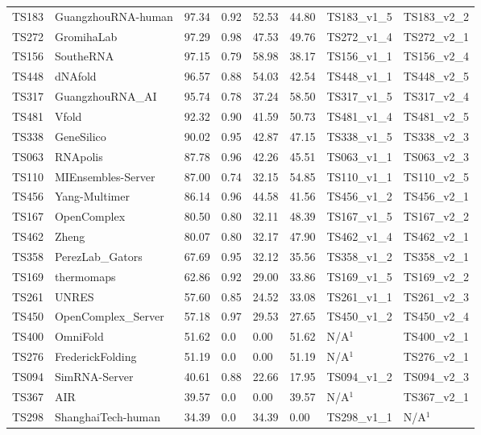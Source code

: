 \begin{table}[ht]
{\begin{tabular}{llllllll}
TS183 & GuangzhouRNA-human & 97.34 & 0.92 & 52.53 & 44.80 & TS183\_v1\_5 & TS183\_v2\_2 \\ 
TS272 & GromihaLab & 97.29 & 0.98 & 47.53 & 49.76 & TS272\_v1\_4 & TS272\_v2\_1 \\ 
TS156 & SoutheRNA & 97.15 & 0.79 & 58.98 & 38.17 & TS156\_v1\_1 & TS156\_v2\_4 \\ 
TS448 & dNAfold & 96.57 & 0.88 & 54.03 & 42.54 & TS448\_v1\_1 & TS448\_v2\_5 \\ 
TS317 & GuangzhouRNA\_AI & 95.74 & 0.78 & 37.24 & 58.50 & TS317\_v1\_5 & TS317\_v2\_4 \\ 
TS481 & Vfold & 92.32 & 0.90 & 41.59 & 50.73 & TS481\_v1\_4 & TS481\_v2\_5 \\ 
TS338 & GeneSilico & 90.02 & 0.95 & 42.87 & 47.15 & TS338\_v1\_5 & TS338\_v2\_3 \\ 
TS063 & RNApolis & 87.78 & 0.96 & 42.26 & 45.51 & TS063\_v1\_1 & TS063\_v2\_3 \\ 
TS110 & MIEnsembles-Server & 87.00 & 0.74 & 32.15 & 54.85 & TS110\_v1\_1 & TS110\_v2\_5 \\ 
TS456 & Yang-Multimer & 86.14 & 0.96 & 44.58 & 41.56 & TS456\_v1\_2 & TS456\_v2\_1 \\ 
TS167 & OpenComplex & 80.50 & 0.80 & 32.11 & 48.39 & TS167\_v1\_5 & TS167\_v2\_2 \\ 
TS462 & Zheng & 80.07 & 0.80 & 32.17 & 47.90 & TS462\_v1\_4 & TS462\_v2\_1 \\ 
TS358 & PerezLab\_Gators & 67.69 & 0.95 & 32.12 & 35.56 & TS358\_v1\_2 & TS358\_v2\_1 \\ 
TS169 & thermomaps & 62.86 & 0.92 & 29.00 & 33.86 & TS169\_v1\_5 & TS169\_v2\_2 \\ 
TS261 & UNRES & 57.60 & 0.85 & 24.52 & 33.08 & TS261\_v1\_1 & TS261\_v2\_3 \\ 
TS450 & OpenComplex\_Server & 57.18 & 0.97 & 29.53 & 27.65 & TS450\_v1\_2 & TS450\_v2\_4 \\ 
TS400 & OmniFold & 51.62 & 0.0 & 0.00 & 51.62 & N/A$^{1}$ & TS400\_v2\_1 \\ 
TS276 & FrederickFolding & 51.19 & 0.0 & 0.00 & 51.19 & N/A$^{1}$ & TS276\_v2\_1 \\ 
TS094 & SimRNA-Server & 40.61 & 0.88 & 22.66 & 17.95 & TS094\_v1\_2 & TS094\_v2\_3 \\ 
TS367 & AIR & 39.57 & 0.0 & 0.00 & 39.57 & N/A$^{1}$ & TS367\_v2\_1 \\ 
TS298 & ShanghaiTech-human & 34.39 & 0.0 & 34.39 & 0.00 & TS298\_v1\_1 & N/A$^{1}$ \\ 

\end{tabular}}
\end{table}
